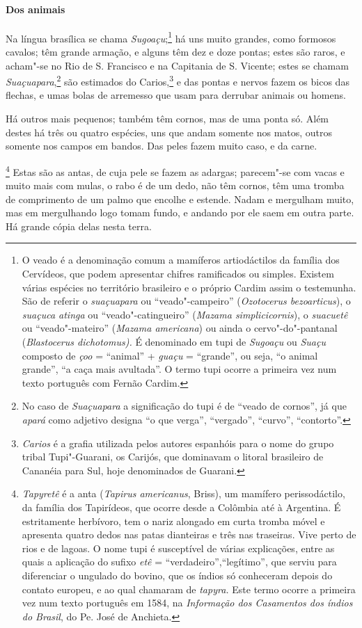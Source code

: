 \paragraph{Dos animais}

 Na língua brasílica se chama \textit{Sugoaçu};\footnote{ O veado 
é a denominação comum a mamíferos artiodáctilos
da família dos Cervídeos, que podem apresentar chifres ramificados ou
simples. Existem várias espécies no território brasileiro e o próprio
Cardim assim o testemunha. São de referir o \textit{suaçuapara} ou
``veado"-campeiro'' (\textit{Ozotocerus bezoarticus}), o \textit{suaçuca
atinga} ou ``veado"-catingueiro'' (\textit{Mazama simplicicornis}), o
\textit{suacuetê} ou ``veado"-mateiro'' (\textit{Mazama americana}) ou
ainda o cervo"-do"-pantanal (\textit{Blastocerus dichotomus).} É
denominado em tupi de \textit{Sugoaçu} ou \textit{Suaçu} composto de
\textit{çoo} = ``animal'' + \textit{guaçu} = ``grande'', ou seja, ``o animal
grande'', ``a caça mais avultada''. O termo tupi ocorre a primeira vez num
texto português com Fernão Cardim.} há uns muito grandes,
como formosos cavalos; têm grande armação, e alguns têm dez e doze
pontas; estes são raros, e acham"-se no Rio de S. Francisco e na
Capitania de S. Vicente; estes se chamam \textit{Suaçuapara},\footnote{ No caso de 
\textit{Suaçuapara} a significação do tupi é
de ``veado de cornos'', já que \textit{apará} como adjetivo designa ``o
que verga'', ``vergado'', ``curvo'', ``contorto''.} são
estimados do Carios,\footnote{ \textit{Carios} é a grafia
utilizada pelos autores espanhóis para o nome do grupo tribal
Tupi"-Guarani, os Carijós, que dominavam o litoral brasileiro de
Cananéia para Sul, hoje denominados de Guarani.} e das pontas e nervos
fazem os bicos das flechas, e umas bolas de arremesso que usam para
derrubar animais ou homens.

Há outros mais pequenos; também têm cornos, mas de uma ponta só. Além
destes há três ou quatro espécies, uns que andam somente nos matos,
outros somente nos campos em bandos. Das peles fazem muito caso, e da carne. 

\footnote{ \textit{Tapyretê} é a anta
(\textit{Tapirus americanus}, Briss), um mamífero
perissodáctilo, da família dos Tapirídeos, que ocorre desde a Colômbia
até à Argentina. É estritamente herbívoro, tem o nariz alongado em
curta tromba móvel e apresenta quatro dedos nas patas dianteiras e três
nas traseiras. Vive perto de rios e de lagoas. O nome tupi é
susceptível de várias explicações, entre as quais a aplicação do sufixo
\textit{etê} = ``verdadeiro'',``legítimo'', que serviu para diferenciar o
ungulado do bovino, que os índios só conheceram depois do contato
europeu, e ao qual chamaram de \textit{tapyra.} Este termo ocorre a
primeira vez num texto português em 1584, na \textit{Informação dos
Casamentos dos índios do Brasil}, do Pe. José de Anchieta.} 
Estas são as antas, de cuja pele se fazem as adargas; parecem"-se com
vacas e muito mais com mulas, o rabo é de um dedo, não têm cornos, têm
uma tromba de comprimento de um palmo que encolhe e estende. Nadam e
mergulham muito, mas em mergulhando logo tomam fundo, e andando por ele
saem em outra parte. Há grande cópia delas nesta terra.

